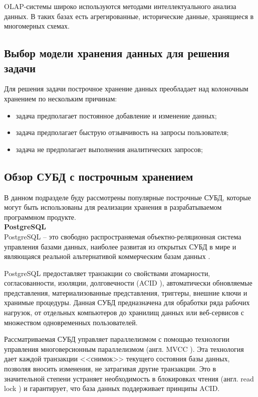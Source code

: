 OLAP-системы широко используются методами интеллектуального анализа данных. В таких базах есть агрегированные, исторические данные, хранящиеся в многомерных схемах. 

\subsection{Выбор модели хранения данных для решения задачи}

Для решения задачи построчное хранение данных преобладает над колоночным хранением по нескольким причинам:

\begin{itemize}
	\item задача предполагает постоянное добавление и изменение данных;
	\item задача предполагает быструю отзывчивость на запросы пользователя;
	\item задача не предполагает выполнения аналитических запросов;
\end{itemize}

\subsection{Обзор СУБД с построчным хранением}

В данном подразделе буду рассмотрены популярные построчные СУБД, которые могут быть использованы для реализации хранения в разрабатываемом программном продукте.\\

\noindent\textbf{PostgreSQL}\\

PostgreSQL \cite{postgresql} -- это свободно распространяемая объектно-реляционная система управления базами данных, наиболее развитая из открытых СУБД в мире и являющаяся реальной альтернативой коммерческим базам данных \cite{postgresql-fact}.

PostgreSQL предоставляет транзакции со свойствами атомарности, согласованности, изоляции, долговечности (ACID \cite{acid}), автоматически обновляемые представления, материализованные представления, триггеры, внешние ключи и хранимые процедуры. Данная СУБД предназначена для обработки ряда рабочих нагрузок, от отдельных компьютеров до хранилищ данных или веб-сервисов с множеством одновременных пользователей. 

Рассматриваемая СУБД управляет параллелизмом с помощью технологии управления многоверсионным параллелизмом (англ. MVCC \cite{mvcc}). Эта технология дает каждой транзакции <<снимок>> текущего состояния базы данных, позволяя вносить изменения, не затрагивая другие транзакции. Это в значительной степени устраняет необходимость в блокировках чтения (англ. read lock \cite{r-lock}) и гарантирует, что база данных поддерживает принципы ACID. \\

